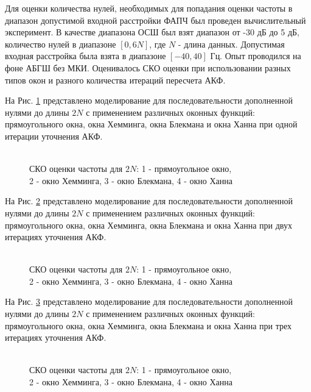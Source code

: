 Для оценки количества нулей, необходимых для попадания оценки частоты в диапазон допустимой входной расстройки ФАПЧ был проведен вычислительный эксперимент. В качестве диапазона
ОСШ был взят диапазон от -30 дБ до 5 дБ, количество нулей в диапазоне ${[0, 6N]}$, где ${N}$ - длина данных. Допустимая входная расстройка была взята в диапазоне ${[-40, 40]}$ Гц.
Опыт проводился на фоне АБГШ без МКИ. Оценивалось СКО оценки при использовании разных типов окон и разного количества итераций пересчета АКФ.

На Рис. \ref{pic:fft2_1} представлено моделирование для последовательности дополненной нулями до длины ${2N}$ с применением различных оконных функций:
прямоугольного окна, окна Хемминга, окна Блекмана и окна Ханна при одной итерации уточнения АКФ.
\begin{figure}[h]
	\center{}
	\caption{\\СКО оценки частоты для ${2N}$: 1 - прямоугольное окно,\\2 - окно Хемминга, 3 - окно Блекмана, 4 - окно Ханна}
	\label{pic:fft2_1}
\end{figure}

На Рис. \ref{pic:fft2_2} представлено моделирование для последовательности дополненной нулями до длины ${2N}$ с применением различных оконных функций:
прямоугольного окна, окна Хемминга, окна Блекмана и окна Ханна при двух итерациях уточнения АКФ.
\begin{figure}[h]
	\center{}
	\caption{\\СКО оценки частоты для ${2N}$: 1 - прямоугольное окно,\\2 - окно Хемминга, 3 - окно Блекмана, 4 - окно Ханна}
	\label{pic:fft2_2}
\end{figure}

На Рис. \ref{pic:fft2_3} представлено моделирование для последовательности дополненной нулями до длины ${2N}$ с применением различных оконных функций:
прямоугольного окна, окна Хемминга, окна Блекмана и окна Ханна при трех итерациях уточнения АКФ.
\begin{figure}[h]
	\center{}
	\caption{\\СКО оценки частоты для ${2N}$: 1 - прямоугольное окно,\\2 - окно Хемминга, 3 - окно Блекмана, 4 - окно Ханна}
	\label{pic:fft2_3}
\end{figure}

